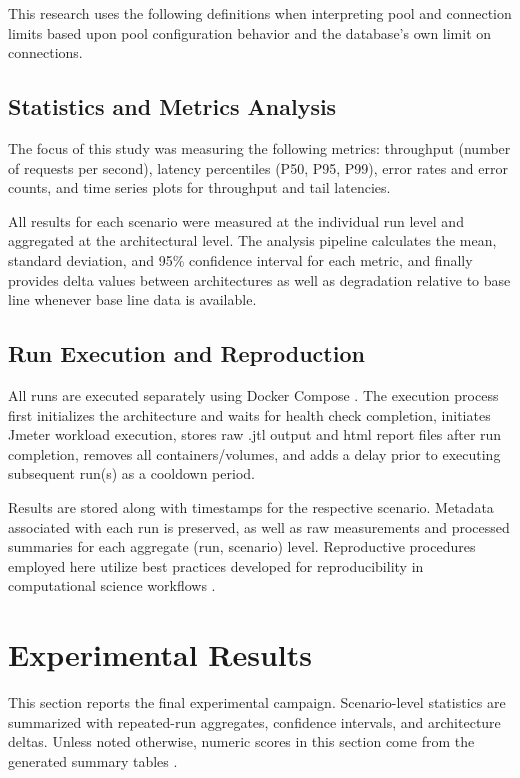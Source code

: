 \documentclass[smallextended,natbib]{svjour3}
\begin{document}
This research uses the following definitions when interpreting pool and connection limits based upon pool configuration behavior and the database's own limit on connections. \cite{hikaricp,postgres_max_connections}

\subsection{Statistics and Metrics Analysis }

The focus of this study was measuring the following metrics: throughput (number of requests per second), latency percentiles (P50, P95, P99), error rates and error counts, and time series plots for throughput and tail latencies.

All results for each scenario were measured at the individual run level and aggregated at the architectural level. The analysis pipeline calculates the mean, standard deviation, and 95\% confidence interval for each metric, and finally provides delta values between architectures as well as degradation relative to base line whenever base line data is available.

\subsection{Run Execution and Reproduction}

All runs are executed separately using Docker Compose \cite{docker_compose}. The execution process first initializes the architecture and waits for health check completion, initiates Jmeter workload execution, stores raw .jtl output and html report files after run completion, removes all containers/volumes, and adds a delay prior to executing subsequent run(s) as a cooldown period.

Results are stored along with timestamps for the respective scenario. Metadata associated with each run is preserved, as well as raw measurements and processed summaries for each aggregate (run, scenario) level. Reproductive procedures employed here utilize best practices developed for reproducibility in computational science workflows \cite{peng_reproducible_research}.

\section{Experimental Results}\label{sec-results}

This section reports the final experimental campaign. Scenario-level statistics are summarized with repeated-run aggregates, confidence intervals, and architecture deltas. Unless noted otherwise, numeric scores in this section come from the generated summary tables \cite{scenario_architecture_stats_table,architecture_delta_by_scenario_table,pool_sweep_summary_table}.
\end{document}
